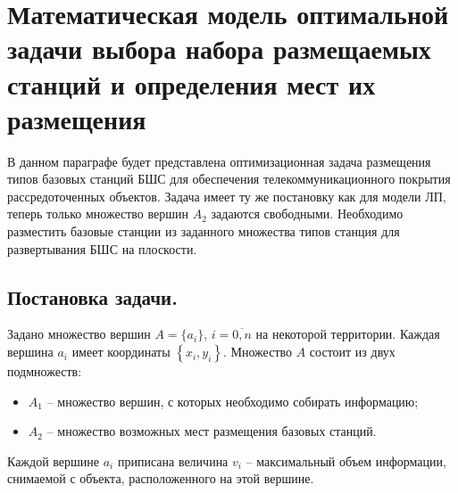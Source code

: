 







\section{Математическая модель оптимальной задачи выбора набора размещаемых станций и определения мест их размещения}

В данном параграфе будет представлена оптимизационная задача размещения типов базовых станций БШС для обеспечения телекоммуникационного покрытия рассредоточенных объектов. Задача имеет ту же постановку как для модели ЛП, теперь  только множество вершин $A_2$ задаются свободными. Необходимо разместить базовые станции из заданного множества типов станция для развертывания БШС на плоскости.

\subsection{Постановка задачи.}

Задано множество вершин $A = \{a_i\}$, $i=\overline{0,n}$ на некоторой территории. Каждая вершина $a_i$ имеет координаты $\left\{ x_i, y_i \right\}$.
Множество $A$ состоит из двух подмножеств: 
\begin{itemize}
    \item $A_1$ -- множество вершин, с которых необходимо собирать информацию;
    \item $A_2$ -- множество возможных мест размещения базовых станций. 
\end{itemize}
Каждой вершине $a_i$ приписана   величина $v_i$ -- максимальный объем информации, снимаемой с объекта, расположенного на этой вершине.

